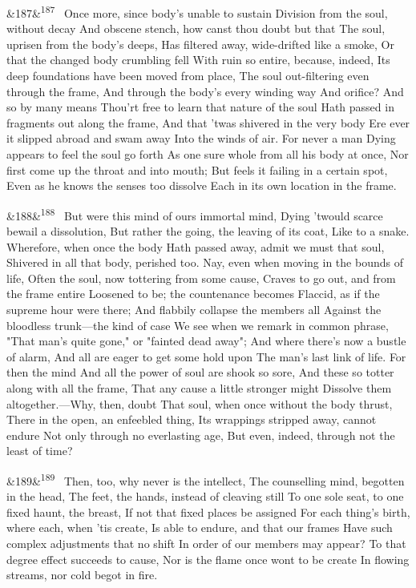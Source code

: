 \documentclass[12pt]{article}
\newcommand{\para}[1][]{\par\noindent\ifx&#1&\else\textsuperscript{\footnotesize #1}~\fi}
\begin{document}
\para[187] Once more, since body's unable to sustain Division from the soul, without decay And obscene stench, how canst thou doubt but that The soul, uprisen from the body's deeps, Has filtered away, wide-drifted like a smoke, Or that the changed body crumbling fell With ruin so entire, because, indeed, Its deep foundations have been moved from place, The soul out-filtering even through the frame, And through the body's every winding way And orifice? And so by many means Thou'rt free to learn that nature of the soul Hath passed in fragments out along the frame, And that 'twas shivered in the very body Ere ever it slipped abroad and swam away Into the winds of air. For never a man Dying appears to feel the soul go forth As one sure whole from all his body at once, Nor first come up the throat and into mouth; But feels it failing in a certain spot, Even as he knows the senses too dissolve Each in its own location in the frame.

\para[188] But were this mind of ours immortal mind, Dying 'twould scarce bewail a dissolution, But rather the going, the leaving of its coat, Like to a snake. Wherefore, when once the body Hath passed away, admit we must that soul, Shivered in all that body, perished too. Nay, even when moving in the bounds of life, Often the soul, now tottering from some cause, Craves to go out, and from the frame entire Loosened to be; the countenance becomes Flaccid, as if the supreme hour were there; And flabbily collapse the members all Against the bloodless trunk---the kind of case We see when we remark in common phrase, "That man's quite gone," or "fainted dead away"; And where there's now a bustle of alarm, And all are eager to get some hold upon The man's last link of life. For then the mind And all the power of soul are shook so sore, And these so totter along with all the frame, That any cause a little stronger might Dissolve them altogether.---Why, then, doubt That soul, when once without the body thrust, There in the open, an enfeebled thing, Its wrappings stripped away, cannot endure Not only through no everlasting age, But even, indeed, through not the least of time?

\para[189] Then, too, why never is the intellect, The counselling mind, begotten in the head, The feet, the hands, instead of cleaving still To one sole seat, to one fixed haunt, the breast, If not that fixed places be assigned For each thing's birth, where each, when 'tis create, Is able to endure, and that our frames Have such complex adjustments that no shift In order of our members may appear? To that degree effect succeeds to cause, Nor is the flame once wont to be create In flowing streams, nor cold begot in fire.
\end{document}
